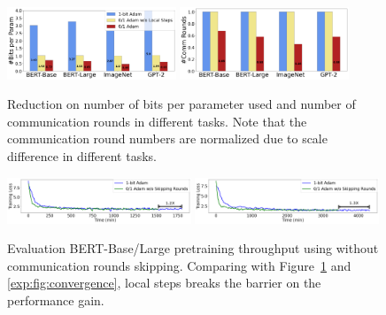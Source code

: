 \begin{figure}[t!]
  \centering
  \includegraphics[width=0.45\textwidth]{./sections/figure/reduction_data_volume.png}
  \includegraphics[width=0.45\textwidth]{./sections/figure/reduction_rounds.png}
  \caption{Reduction on number of bits per parameter used and number of communication rounds in different tasks. Note that the communication round numbers are normalized due to scale difference in different tasks.}%
  \label{exp:fig:data_volume}
\end{figure}

\begin{figure}[t!]
  \centering
  \includegraphics[width=0.49\textwidth]{./sections/figure/verify_v2_bbase.png}
  \includegraphics[width=0.49\textwidth]{./sections/figure/verify_v2_blarge.png}
  \caption{Evaluation BERT-Base/Large pretraining throughput using {\myalgo} without communication rounds skipping. Comparing with Figure~\ref{exp:fig:data_volume} and \ref{exp:fig:convergence}, local steps breaks the barrier on the performance gain.}
  \label{exp:fig:verify_v2}
\end{figure}

